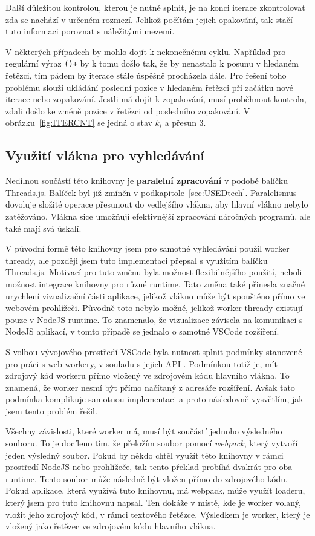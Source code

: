 Další důležitou kontrolou, kterou je nutné splnit, je na konci iterace zkontrolovat zda se nachází v určeném rozmezí.
Jelikož počítám jejich opakování, tak stačí tuto informaci porovnat s náležitými mezemi.

V některých případech by mohlo dojít k nekonečnému cyklu.
Například pro regulární výraz \texttt{()+} by k tomu došlo tak, že by nenastalo k posunu v hledaném řetězci, tím pádem by iterace stále úspěšně procházela dále.
Pro řešení toho problému slouží ukládání poslední pozice v hledaném řetězci při začátku nové iterace nebo zopakování.
Jestli má dojít k zopakování, musí proběhnout kontrola, zdali došlo ke změně pozice v řetězci od posledního zopakování.
V obrázku~\ref{fig:ITERCNT} se jedná o stav $k_i$ a přesun $3$.

\subsection*{Využití vlákna pro vyhledávání}
Nedílnou součástí této knihovny je \textbf{paralelní zpracování} v podobě balíčku Threads.js.
Balíček byl již zmíněn v podkapitole~\ref{sec:USEDtech}.
Paralelismus dovoluje složité operace přesunout do vedlejšího vlákna, aby hlavní vlákno nebylo zatěžováno.
Vlákna sice umožňují efektivnější zpracování náročných programů, ale také mají svá úskalí.

V původní formě této knihovny jsem pro samotné vyhledávání použil worker thready, ale později jsem tuto implementaci přepsal s využitím balíčku Threads.js.
Motivací pro tuto změnu byla možnost flexibilnějšího použití, neboli možnost integrace knihovny pro různé runtime.
Tato změna také přinesla značné urychlení vizualizační části aplikace, jelikož vlákno může být spouštěno přímo ve webovém prohlížeči.
Původně toto nebylo možné, jelikož worker thready existují pouze v NodeJS runtime.
To znamenalo, že vizualizace závisela na komunikaci s NodeJS aplikací, v tomto případě se jednalo o samotné VSCode rozšíření.

S volbou vývojového prostředí VSCode byla nutnost splnit podmínky stanovené pro práci s web workery, v souladu s jejich API \cite{Microsoft_2021}. 
Podmínkou totiž je, mít zdrojový kód workeru přímo vložený ve zdrojovém kódu hlavního vlákna.
To znamená, že worker nesmí být přímo načítaný z adresáře rozšíření.
Avšak tato podmínka komplikuje samotnou implementaci a proto následovně vysvětlím, jak jsem tento problém řešil.

Všechny závislosti, které worker má, musí být součástí jednoho výsledného souboru.
To je docíleno tím, že přeložím soubor pomocí \textit{webpack}, který vytvoří jeden výsledný soubor.
Pokud by někdo chtěl využít této knihovny v rámci prostředí NodeJS nebo prohlížeče, tak tento překlad probíhá dvakrát pro oba runtime.
Tento soubor může následně být vložen přímo do zdrojového kódu.
Pokud aplikace, která využívá tuto knihovnu, má webpack, může využít loaderu, který jsem pro tuto knihovnu napsal. 
Ten dokáže v místě, kde je worker volaný, vložit jeho zdrojový kód, v rámci textového řetězce.
Výsledkem je worker, který je vložený jako řetězec ve zdrojovém kódu hlavního vlákna.

